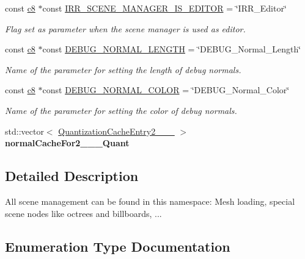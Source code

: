 \begin{DoxyCompactItemize}
const \hyperlink{namespaceirr_a9395eaea339bcb546b319e9c96bf7410}{c8} $\ast$const \hyperlink{namespaceirr_1_1scene_a7a3f4a75d85bd2b3f6bc4dd58f3ce585}{I\+R\+R\+\_\+\+S\+C\+E\+N\+E\+\_\+\+M\+A\+N\+A\+G\+E\+R\+\_\+\+I\+S\+\_\+\+E\+D\+I\+T\+OR} = \char`\"{}I\+R\+R\+\_\+\+Editor\char`\"{}
\begin{DoxyCompactList}\small\item\em Flag set as parameter when the scene manager is used as editor. \end{DoxyCompactList}\item 
const \hyperlink{namespaceirr_a9395eaea339bcb546b319e9c96bf7410}{c8} $\ast$const \hyperlink{namespaceirr_1_1scene_a19153395855d08302b70dcfa9247eb51}{D\+E\+B\+U\+G\+\_\+\+N\+O\+R\+M\+A\+L\+\_\+\+L\+E\+N\+G\+TH} = \char`\"{}D\+E\+B\+U\+G\+\_\+\+Normal\+\_\+\+Length\char`\"{}
\begin{DoxyCompactList}\small\item\em Name of the parameter for setting the length of debug normals. \end{DoxyCompactList}\item 
const \hyperlink{namespaceirr_a9395eaea339bcb546b319e9c96bf7410}{c8} $\ast$const \hyperlink{namespaceirr_1_1scene_a767a12984dbf7a4f0917993d748d1350}{D\+E\+B\+U\+G\+\_\+\+N\+O\+R\+M\+A\+L\+\_\+\+C\+O\+L\+OR} = \char`\"{}D\+E\+B\+U\+G\+\_\+\+Normal\+\_\+\+Color\char`\"{}
\begin{DoxyCompactList}\small\item\em Name of the parameter for setting the color of debug normals. \end{DoxyCompactList}\item 
std\+::vector$<$ \hyperlink{classirr_1_1scene_1_1QuantizationCacheEntry2__10__10__10}{Quantization\+Cache\+Entry2\+\_\+\_\+\_} $>$ {\bfseries normal\+Cache\+For2\+\_\+\_\+\_\+Quant}\hypertarget{namespaceirr_1_1scene_a8a9726c135628d4d5b895760cf0cfff5}{}\label{namespaceirr_1_1scene_a8a9726c135628d4d5b895760cf0cfff5}

\end{DoxyCompactItemize}


\subsection{Detailed Description}
All scene management can be found in this namespace\+: Mesh loading, special scene nodes like octrees and billboards, ... 

\subsection{Enumeration Type Documentation}
